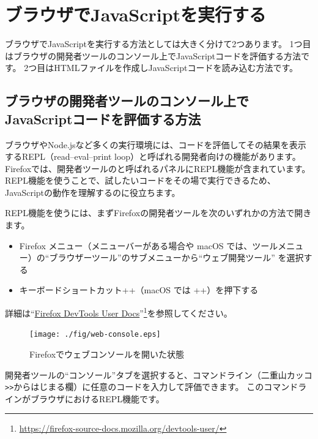 \hypertarget{execute-js-on-browser}{%
\section{ブラウザでJavaScriptを実行する}\label{execute-js-on-browser}}

ブラウザでJavaScriptを実行する方法としては大きく分けて2つあります。
1つ目はブラウザの開発者ツールのコンソール上でJavaScriptコードを評価する方法です。
2つ目はHTMLファイルを作成しJavaScriptコードを読み込む方法です。

\hypertarget{repl-on-browser}{%
\subsection{ブラウザの開発者ツールのコンソール上でJavaScriptコードを評価する方法}\label{repl-on-browser}}

ブラウザやNode.jsなど多くの実行環境には、コードを評価してその結果を表示するREPL（read--eval--print
loop）と呼ばれる開発者向けの機能があります。
Firefoxでは、開発者ツールの\textbf{}と呼ばれるパネルにREPL機能が含まれています。
REPL機能を使うことで、試したいコードをその場で実行できるため、JavaScriptの動作を理解するのに役立ちます。

REPL機能を使うには、まずFirefoxの開発者ツールを次のいずれかの方法で開きます。

\begin{itemize}
\item
  Firefox メニュー（メニューバーがある場合や macOS
  では、ツールメニュー）の``ブラウザーツール''のサブメニューから``ウェブ開発ツール''
  を選択する
\item
  キーボードショートカット++（macOS では
  ++）を押下する
\end{itemize}

詳細は``\href{https://firefox-source-docs.mozilla.org/devtools-user/}{Firefox DevTools User Docs}''\footnote{\url{https://firefox-source-docs.mozilla.org/devtools-user/}}を参照してください。

\begin{figure}[h]
\centering
\texttt{[image: ./fig/web-console.eps]}
\caption{Firefoxでウェブコンソールを開いた状態}
\end{figure}

開発者ツールの``コンソール''タブを選択すると、コマンドライン（二重山カッコ\lstinline{>>}からはじまる欄）に任意のコードを入力して評価できます。
このコマンドラインがブラウザにおけるREPL機能です。

